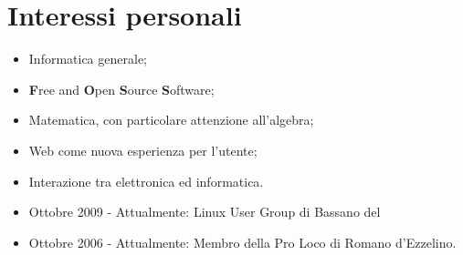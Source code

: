 \documentclass[pdftex, a4paper, 11pt]{article}
\begin{document}


\section*{Interessi personali}
\begin{itemize}
\item Informatica generale;
\item {\bf F}ree and {\bf O}pen {\bf S}ource {\bf S}oftware;
\item Matematica, con particolare attenzione all'algebra;
\item Web come nuova esperienza per l'utente;
\item Interazione tra elettronica ed informatica.
\item Ottobre 2009 - Attualmente: Linux User Group di Bassano del
\item Ottobre 2006 - Attualmente: Membro della Pro Loco di Romano d'Ezzelino.
\end{itemize}
\end{document}
